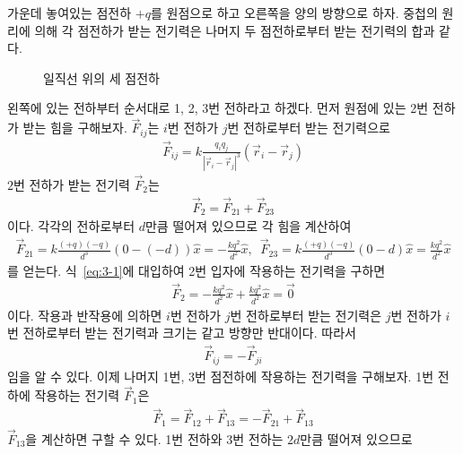 \documentclass[floatfix,nofootinbib,superscriptaddress,fleqn,notitlepage]{revtex4-2}
\begin{document}
가운데 놓여있는 점전하 $+q$를 원점으로 하고 오른쪽을 양의 방향으로 하자. 중첩의 원리에 의해 각 점전하가
받는 전기력은 나머지 두 점전하로부터 받는 전기력의 합과 같다. 
\begin{figure}[htp]
  \centering
  \caption{일직선 위의 세 점전하}
  \label{fig:11}
\end{figure}
왼쪽에 있는 전하부터 순서대로 1, 2, 3번
전하라고 하겠다. 먼저 원점에 있는 2번 전하가 받는 힘을 구해보자. $\vec{F}_{ij}$는 $i$번 전하가 
$j$번 전하로부터 받는 전기력으로
\begin{align}
  \vec{F}_{ij}=k\frac{q_i q_j}{|\vec{r}_i-\vec{r}_j|^3}(\vec{r}_i-\vec{r}_j)
\end{align}
$2$번 전하가 받는 전기력 $\vec{F}_2$는
\begin{align}\label{eq:3-1}
  \vec{F}_2 = \vec{F}_{21}+\vec{F}_{23}
\end{align}
이다. 각각의 전하로부터 $d$만큼 떨어져 있으므로 각 힘을 계산하여
\begin{align}
  \vec{F}_{21}=k\frac{(+q)(-q)}{d^3}(0-(-d))\hat{x}=-\frac{kq^2}{d^2}\hat{x},\,\,\,
  \vec{F}_{23}=k\frac{(+q)(-q)}{d^3}(0-d)\hat{x}=\frac{kq^2}{d^2}\hat{x}
\end{align}
를 얻는다. 식~\ref{eq:3-1}에 대입하여 2번 입자에 작용하는 전기력을 구하면
\begin{align}
  \vec{F}_2 = -\frac{kq^2}{d^2}\hat{x}+\frac{kq^2}{d^2}\hat{x}=\vec{0}
\end{align}
이다. 작용과 반작용에 의하면 $i$번 전하가 $j$번 전하로부터 받는 전기력은 $j$번 전하가 $i$번 전하로부터 
받는 전기력과 크기는 같고 방향만 반대이다. 따라서
\begin{align}
  \vec{F}_{ij}=-\vec{F}_{ji}
\end{align} 
임을 알 수 있다. 이제 나머지 1번, 3번 점전하에 작용하는 전기력을 구해보자. 1번 전하에 작용하는 전기력 
$\vec{F}_1$은
\begin{align}
  \vec{F}_1 = \vec{F}_{12}+\vec{F}_{13} =-\vec{F}_{21}+\vec{F}_{13}
\end{align}
$\vec{F}_{13}$을 계산하면 구할 수 있다. 1번 전하와 3번 전하는 $2d$만큼 떨어져 있으므로
\end{document}
